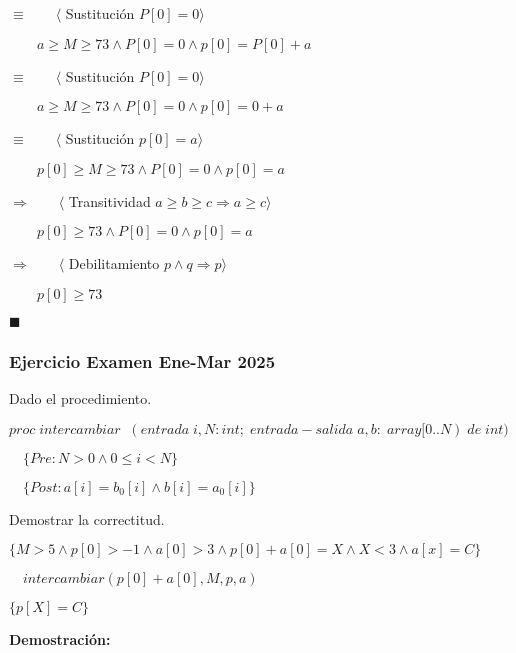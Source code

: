 \documentclass[hidelinks]{article}
\begin{document}
\begin{enumerate}
	      $\equiv \qquad \langle$ Sustitución $ P[0]=0 \rangle$ \par
	      $\qquad a \geq M \geq 73 \land P[0]=0 \land p[0] = P[0] + a$ \par
	      $\equiv \qquad \langle$ Sustitución $ P[0]=0 \rangle$ \par
	      $\qquad a \geq M \geq 73 \land P[0]=0 \land p[0] = 0 + a$ \par
	      $\equiv \qquad \langle$ Sustitución $ p[0]=a \rangle$ \par
	      $\qquad p[0] \geq M \geq 73 \land P[0]=0 \land p[0] = a$ \par
	      $\Rightarrow \qquad \langle$ Transitividad $ a \geq b \geq c \Rightarrow a \geq c \rangle$ \par
	      $\qquad p[0] \geq 73 \land P[0]=0 \land p[0] = a$ \par
	      $\Rightarrow \qquad \langle$ Debilitamiento $ p \land q \Rightarrow p \rangle$ \par
	      $\qquad p[0] \geq 73 $ \par
		  $\blacksquare$
\end{enumerate}

\newpage


\subsubsection{Ejercicio Examen Ene-Mar 2025}

Dado el procedimiento.\par
$proc \; intercambiar \; \; (entrada \; i,N:int; \; entrada-salida \; a,b: \; array[0..N) \; de \; int) $\par
$\quad \{Pre: N > 0 \land 0 \leq i < N\}$\par
$\quad \{Post: a[i] = b_0[i] \land b[i] = a_0[i]\}$\par

Demostrar la correctitud.\par

$\{M > 5 \land p[0] > -1 \land a[0] > 3 \land p[0] + a[0] = X \land X < 3 \land a[x] = C\}$\par
$\quad intercambiar(p[0]+a[0],M,p,a)$\par
$\{p[X] = C\}$ \par

\vspace{2em}

\textbf{Demostración:}\par
\end{document}
